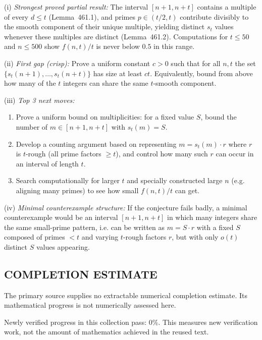 (i) \emph{Strongest proved partial result:} The interval $[n+1,n+t]$ contains a multiple of every $d\le t$ (Lemma~461.1), and primes $p\in(t/2,t)$ contribute divisibly to the smooth component of their unique multiple, yielding distinct $s_t$ values whenever these multiples are distinct (Lemma~461.2). Computations for $t\le 50$ and $n\le 500$ show $f(n,t)/t$ is never below $0.5$ in this range.

(ii) \emph{First gap (crisp):} Prove a uniform constant $c>0$ such that for all $n,t$ the set $\{s_t(n+1),\dots,s_t(n+t)\}$ has size at least $ct$. Equivalently, bound from above how many of the $t$ integers can share the same $t$-smooth component.

(iii) \emph{Top 3 next moves:}
\begin{enumerate}
\item Prove a uniform bound on multiplicities: for a fixed value $S$, bound the number of $m\in[n+1,n+t]$ with $s_t(m)=S$.
\item Develop a counting argument based on representing $m=s_t(m)\cdot r$ where $r$ is $t$-rough (all prime factors $\ge t$), and control how many such $r$ can occur in an interval of length $t$.
\item Search computationally for larger $t$ and specially constructed large $n$ (e.g. aligning many primes) to see how small $f(n,t)/t$ can get.
\end{enumerate}

(iv) \emph{Minimal counterexample structure:} If the conjecture fails badly, a minimal counterexample would be an interval $[n+1,n+t]$ in which many integers share the same small-prime pattern, i.e. can be written as $m=S\cdot r$ with a fixed $S$ composed of primes $<t$ and varying $t$-rough factors $r$, but with only $o(t)$ distinct $S$ values appearing.




\subsection*{COMPLETION ESTIMATE}
The primary source supplies no extractable numerical completion estimate. Its mathematical progress is not numerically assessed here.

Newly verified progress in this collection pass: $0\%$. This measures new verification work, not the amount of mathematics achieved in the reused text.
